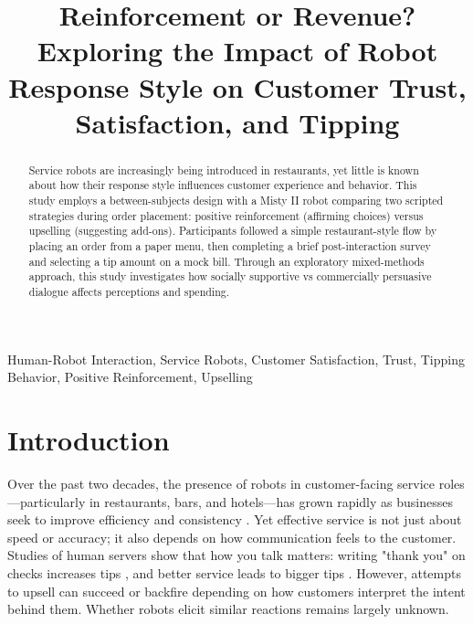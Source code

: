 \documentclass[conference]{IEEEtran}
\begin{document}
\title{Reinforcement or Revenue? Exploring the Impact of Robot Response Style on Customer Trust, Satisfaction, and Tipping}

\author{
\and
{}
}

\maketitle

\begin{abstract}
Service robots are increasingly being introduced in restaurants, yet little is known about how their response style influences customer experience and behavior. This study employs a between-subjects design with a Misty II robot comparing two scripted strategies during order placement: positive reinforcement (affirming choices) versus upselling (suggesting add-ons). Participants followed a simple restaurant-style flow by placing an order from a paper menu, then completing a brief post-interaction survey and selecting a tip amount on a mock bill. Through an exploratory mixed-methods approach, this study investigates how socially supportive vs commercially persuasive dialogue affects perceptions and spending.
\end{abstract}

\begin{IEEEkeywords}
Human-Robot Interaction, Service Robots, Customer Satisfaction, Trust, Tipping Behavior, Positive Reinforcement, Upselling
\end{IEEEkeywords}

\section{Introduction}
\label{sec:introduction}

Over the past two decades, the presence of robots in customer-facing service roles—particularly in restaurants, bars, and hotels—has grown rapidly as businesses seek to improve efficiency and consistency \cite{b1, b2}. Yet effective service is not just about speed or accuracy; it also depends on how communication feels to the customer. Studies of human servers show that how you talk matters: writing "thank you" on checks increases tips \cite{b3}, and better service leads to bigger tips \cite{b4}. However, attempts to upsell can succeed or backfire depending on how customers interpret the intent behind them. Whether robots elicit similar reactions remains largely unknown.
\end{document}
